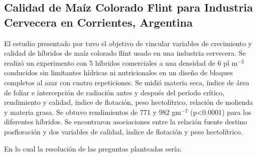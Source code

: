 \subsection{Calidad de Maíz Colorado Flint para Industria Cervecera en Corrientes, Argentina}

El estudio presentado por \cite{balbi2010calidad} tuvo el objetivo de vincular variables de crecimiento y calidad de híbridos de maíz colorado flint usado en una industria cervecera. Se realizó un experimento con 5 híbridos comerciales a una densidad de 6 pl m$^{-2}$ conducidos sin limitantes hídricas ni nutricionales en un diseño de bloques completos al azar con cuatro repeticiones. Se midió materia seca, índice de área de foliar e intercepción de radiación antes y después del período crítico, rendimiento y calidad, índice de flotación, peso hectolítrico, relación de molienda y materia grasa. Se obtuvo rendimientos de 771 y 982 gm$^{-2}$ (p<0.0001) para los diferentes híbridos. Se encontraron asociaciones entre la relación fuente destino posfloración y dos variables de calidad, índice de flotación y peso hectolítrico.

En lo cual la resolución de las preguntas planteadas sería:


